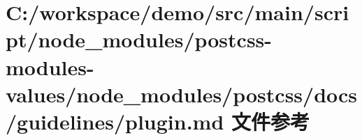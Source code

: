\hypertarget{postcss-modules-values_2node__modules_2postcss_2docs_2guidelines_2plugin_8md}{}\section{C\+:/workspace/demo/src/main/script/node\+\_\+modules/postcss-\/modules-\/values/node\+\_\+modules/postcss/docs/guidelines/plugin.md 文件参考}
\label{postcss-modules-values_2node__modules_2postcss_2docs_2guidelines_2plugin_8md}
